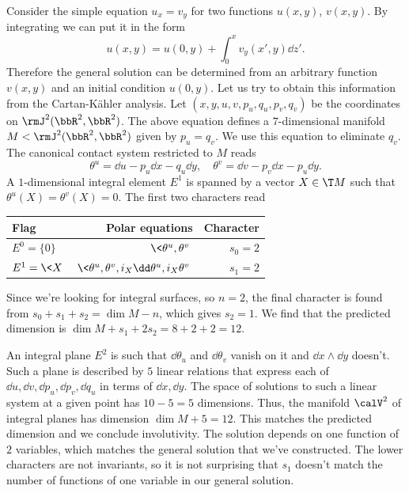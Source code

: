 \begin{example}\label{ex ux=vy 1}
    Consider the simple equation $u_x=v_y$ for two functions $u(x,y)$, $v(x,y)$. By integrating we can put it in the form 
    \[u(x,y)=u(0,y)+\int_0^x v_y(x',y)\dd z'.\]
    Therefore the general solution can be determined from an arbitrary function $v(x,y)$ and an initial condition $u(0,y)$. Let us try to obtain this information from the Cartan-K\"ahler analysis. Let $(x,y,u,v,p_u,q_u,p_v,q_v)$ be the coordinates on $\rmJ^2(\bbR^2,\bbR^2)$. The above equation defines a $7$-dimensional manifold $M<\rmJ^2(\bbR^2,\bbR^2)$ given by $p_u=q_v$. We use this equation to eliminate $q_v$. The canonical contact system restricted to $M$ reads 
    \[\theta^u=\dd u-p_u\dd x-q_u\dd y,\quad \theta^v=\dd v-p_v\dd x-p_u\dd y.\]
    A $1$-dimensional integral element $E^1$ is spanned by a vector $X\in \T M$ such that $\theta^u(X)=\theta^v(X)=0$. The first two characters read 
    \begin{center}
        \begin{tabular}{l r r} 
         Flag & Polar equations & Character \\ [0.5ex] 
         \hline
         $E^0=\{0\}$ & $\<\theta^u,\theta^v\>$ & $s_0=2$ \\ 
         $E^1=\<X\>$ & $\<\theta^u,\theta^v,i_X\dd\theta^u,i_X\theta^v\>$ & $s_1=2$ \\
         \hline
        \end{tabular}
    \end{center}
    Since we're looking for integral surfaces, so $n=2$, the final character is found from $s_0+s_1+s_2=\dim M-n$, which gives $s_2=1$.
    We find that the predicted dimension is $\dim M+s_1+2s_2=8+2+2=12$. 

    An integral plane $E^2$ is such that $\dd\theta_u$ and $\dd\theta_v$ vanish on it and $\dd x\wedge\dd y$ doesn't. Such a plane is described by $5$ linear relations that express each of $\dd u,\dd v,\dd p_u,\dd p_v,\dd q_u$ in terms of $\dd x,\dd y$. The space of solutions to such a linear system at a given point has $10-5=5$ dimensions. Thus, the manifold $\calV^2$ of integral planes has dimension $\dim M+5=12$. This matches the predicted dimension and we conclude involutivity. The solution depends on one function of $2$ variables, which matches the general solution that we've constructed. The lower characters are not invariants, so it is not surprising that $s_1$ doesn't match the number of functions of one variable in our general solution.
\end{example}

